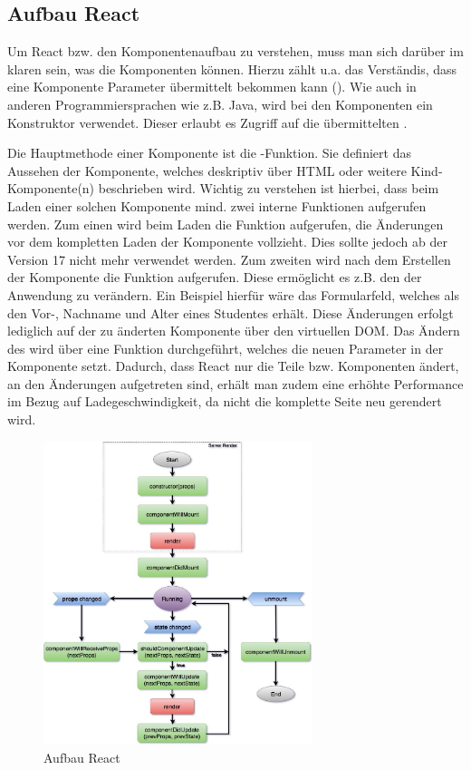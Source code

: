 
\subsection{Aufbau React}
\label{ssec:AufbauReact}

Um React bzw. den Komponentenaufbau zu verstehen, muss man sich darüber im klaren sein, was die Komponenten können. 
Hierzu zählt u.a. das Verständis, dass eine Komponente Parameter übermittelt bekommen kann (\props). 
Wie auch in anderen Programmiersprachen wie z.B. Java, wird bei den Komponenten ein Konstruktor  verwendet.
Dieser erlaubt es Zugriff auf die übermittelten \props. 

Die Hauptmethode einer Komponente ist die \render-Funktion. 
Sie definiert das Aussehen der Komponente, welches deskriptiv über \acs{HTML} oder weitere Kind-Komponente(n) beschrieben wird. 
Wichtig zu verstehen ist hierbei, dass beim Laden einer solchen Komponente mind. zwei interne Funktionen aufgerufen werden. 
Zum einen wird beim Laden die Funktion \cwm aufgerufen, die Änderungen vor dem kompletten Laden der Komponente vollzieht. Dies sollte jedoch ab der Version 17 nicht mehr verwendet werden. 
Zum zweiten wird nach dem Erstellen der Komponente die Funktion \cdm aufgerufen. 
Diese ermöglicht es z.B. den \state  der Anwendung zu verändern. 
Ein Beispiel hierfür wäre das Formularfeld, welches als \props den Vor-, Nachname und Alter eines Studentes erhält. 
Diese Änderungen erfolgt lediglich auf der zu änderten Komponente über den virtuellen \acs{DOM}. 
Das Ändern des \state wird über eine Funktion \exampleState durchgeführt, welches die neuen Parameter in der Komponente setzt. 
Dadurch, dass React nur die Teile bzw. Komponenten ändert, an den Änderungen aufgetreten sind, erhält man zudem eine erhöhte Performance im Bezug auf Ladegeschwindigkeit, da nicht die komplette Seite neu gerendert wird. 

\begin{figure}[hp]
	\centering
	\includegraphics[width=0.70\textwidth, keepaspectratio]{img/client/Lifecycle.jpeg}
	\captionsetup{justification=centering, format=plain}
	\caption[Aufbau React]{Aufbau React \\ \quelle \cite{reactLifeCycle}}
	\label{fig:ReactLifecylce}
\end{figure}
